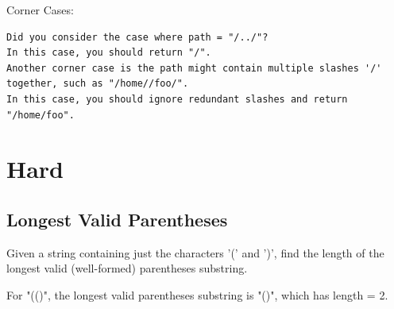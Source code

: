 \documentclass[12pt]{book}
\begin{document}
Corner Cases:
\lstset{language=java,label= ,caption= ,numbers=none}
\begin{lstlisting}
Did you consider the case where path = "/../"?
In this case, you should return "/".
Another corner case is the path might contain multiple slashes '/' together, such as "/home//foo/".
In this case, you should ignore redundant slashes and return "/home/foo".
\end{lstlisting}

\section{Hard}
\label{sec-5-3}
\subsection{Longest Valid Parentheses}
\label{sec-5-3-1}
Given a string containing just the characters '(' and ')', find the length of the longest valid (well-formed) parentheses substring.

For "(()", the longest valid parentheses substring is "()", which has length = 2.
\end{document}
